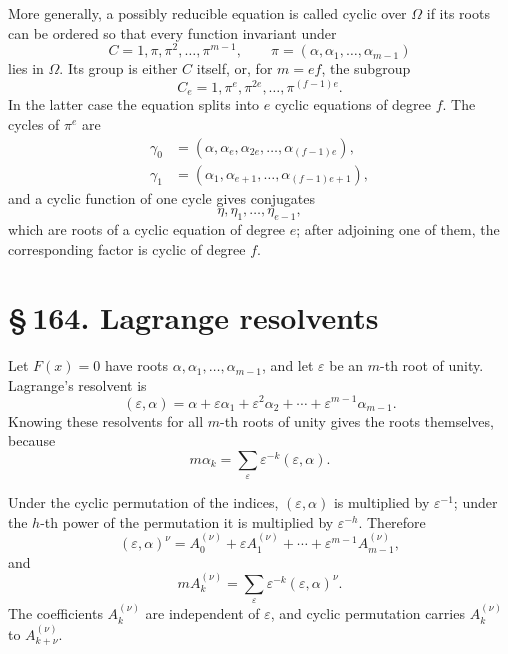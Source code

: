 \documentclass[11pt]{article}
\providecommand{\sect}[2]{\section*{\S\,#1. #2}}
\begin{document}
More generally, a possibly reducible equation is called cyclic over $\Omega$ if its roots can be ordered so that every function invariant under
\[
        C=1,\pi,\pi^2,
        \ldots,
        \pi^{m-1},
        \qquad
        \pi=(\alpha,
        \alpha_1,
        \ldots,
        \alpha_{m-1})                                                   \tag{8}
\]
lies in $\Omega$. Its group is either $C$ itself, or, for $m=ef$, the subgroup
\[
        C_e=1,\pi^e,
        \pi^{2e},
        \ldots,
        \pi^{(f-1)e}.                                                   \tag{9}
\]
In the latter case the equation splits into $e$ cyclic equations of degree $f$. The cycles of $\pi^e$ are
\[
\begin{aligned}
\gamma_0&=(\alpha,\alpha_e,\alpha_{2e},\ldots,\alpha_{(f-1)e}),\\
\gamma_1&=(\alpha_1,\alpha_{e+1},\ldots,\alpha_{(f-1)e+1}),
\end{aligned}                                                          \tag{10}
\]
and a cyclic function of one cycle gives conjugates
\[
        \eta,
        \eta_1,
        \ldots,
        \eta_{e-1},                                                     \tag{11}
\]
which are roots of a cyclic equation of degree $e$; after adjoining one of them, the corresponding factor is cyclic of degree $f$.

\sect{164}{Lagrange resolvents}

Let $F(x)=0$ have roots $\alpha,
\alpha_1,
\ldots,
\alpha_{m-1}$, and let $\varepsilon$ be an $m$-th root of unity. Lagrange's resolvent is
\[
        (\varepsilon,\alpha)=
        \alpha+\varepsilon\alpha_1+
        \varepsilon^2\alpha_2+
        \cdots+
        \varepsilon^{m-1}\alpha_{m-1}.                                  \tag{1}
\]
Knowing these resolvents for all $m$-th roots of unity gives the roots themselves, because
\[
        m\alpha_k=
        \sum_{\varepsilon}\varepsilon^{-k}(\varepsilon,\alpha).          \tag{4}
\]

Under the cyclic permutation of the indices, $(\varepsilon,\alpha)$ is multiplied by $\varepsilon^{-1}$; under the $h$-th power of the permutation it is multiplied by $\varepsilon^{-h}$. Therefore
\[
        (\varepsilon,\alpha)^\nu
        =A_0^{(\nu)}+
        \varepsilon A_1^{(\nu)}+
        \cdots+
        \varepsilon^{m-1}A_{m-1}^{(\nu)},                                \tag{5}
\]
and
\[
        mA_k^{(\nu)}=
        \sum_{\varepsilon}\varepsilon^{-k}(\varepsilon,\alpha)^\nu.       \tag{6}
\]
The coefficients $A_k^{(\nu)}$ are independent of $\varepsilon$, and cyclic permutation carries $A_k^{(\nu)}$ to $A_{k+\nu}^{(\nu)}$.
\end{document}
